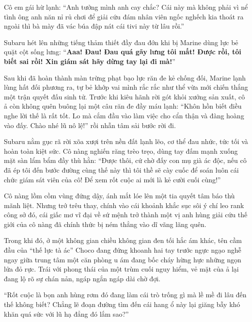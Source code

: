 \documentclass[../main.tex]{subfiles}
\begin{document}
Cô em gái hừ lạnh: ``Anh tưởng mình anh cay chắc? Cái này mà không phải vì nể tình ông anh năn nỉ rủ chơi để giải cứu đám nhân viên ngốc nghếch kia thoát ra ngoài thì bà mày đã vác búa đập nát cái tivi này từ lâu rồi.''

\il

Subaru hét lên những tiếng thảm thiết đầy đau đớn khi bị Marine dùng lực bẻ quặt cột sống lưng: ``\textbf{Aaa! Đau! Đau quá gãy lưng tôi mất! Được rồi, tôi biết sai rồi! Xin giám sát hãy dừng tay lại đi mà!}''

Sau khi đã hoàn thành màn trừng phạt bạo lực răn đe kẻ chống đối, Marine lạnh lùng hất đối phương ra, tự bẻ khớp vai mình rắc rắc như thể vừa mới chiến thắng một trận quyết đấu sinh tử. Trước khi kiêu hãnh rời gót khỏi xưởng sản xuất, cô ả còn không quên buông lại một câu răn đe đầy máu lạnh: ``Khôn hồn biết điều nghe lời thế là rất tốt. Lo mà cắm đầu vào làm việc cho cẩn thận và đàng hoàng vào đấy. Chào nhé lũ nô lệ!'' rồi nhẫn tâm sải bước rời đi.

Subaru nằm gục rã rời xõa xượi trên nền đất lạnh lẽo, cơ thể đau nhức, tức tối và hoàn toàn kiệt sức. Cô nàng nghiến răng trèo trẹo, dùng tay đấm mạnh xuống mặt sàn lẩm bẩm đầy thù hằn: ``Được thôi, cứ chờ đấy con mụ già ác độc, nếu cô đã ép tôi đến bước đường cùng thế này thì tôi thề sẽ cày cuốc để soán luôn cái chức giám sát viên của cô! Để xem rốt cuộc ai mới là kẻ cười cuối cùng!''


Cô nàng lồm cồm vùng đứng dậy, ánh mắt lóe lên một tia quyết tâm báo thù mãnh liệt. Nhưng trớ trêu thay, chính vào cái khoảnh khắc sục sôi ý chí leo rank công sở đó, cái giấc mơ vĩ đại về sứ mệnh trở thành một vị anh hùng giải cứu thế giới của cô nàng đã chính thức bị ném thẳng vào dĩ vãng lãng quên.

\ct

Trong khi đó, ở một không gian chiều không gian đen tối hắc ám khác, tên cầm đầu của ``thế lực tà ác'' Choco đang đứng khoanh hai tay trước ngực ngạo nghễ ngay giữa trung tâm một căn phòng u ám đang bốc cháy hừng hực những ngọn lửa đỏ rực. Trái với phong thái của một trùm cuối nguy hiểm, vẻ mặt của ả lại đang lộ rõ sự chán nản, ngáp ngắn ngáp dài chờ đợi.

``Rốt cuộc là bọn anh hùng rơm đó đang làm cái trò trống gì mà lề mề đi lâu đến thế không biết? Chẳng lẽ đoạn đường tìm đến cái hang ổ này lại giăng bẫy khó khăn quá sức với lũ hạ đẳng đó lắm sao?''

\end{document}
